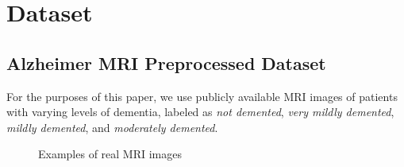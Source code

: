 \documentclass [MS] {uclathes}
\begin{document}
\chapter{Dataset}

\section{Alzheimer MRI Preprocessed Dataset}
For the purposes of this paper, we use publicly available MRI images of patients with varying levels of dementia, 
labeled as \textit{not demented}, \textit{very mildly demented}, \textit{mildly demented}, and \textit{moderately 
demented}.

\begin{figure}[H]
    \centering
    \hfill
    \hfill
    \hfill
    \caption{Examples of real MRI images}
\end{figure}
\end{document}
